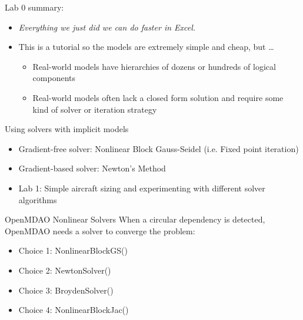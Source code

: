 \documentclass[aspectratio=169, usenames,dvipsnames, 14pt]{beamer}
\begin{document}
\begin{frame}{Lab 0 summary:}
    \begin{itemize}
        \item \textit{Everything we just did we can do faster in Excel.}
        \vspace{0.5cm}
        \item This is a tutorial so the models are extremely simple and cheap, but … 
        \vspace{0.25cm}
            \begin{itemize}
                \vspace{0.25cm}
                \item Real-world models have hierarchies of dozens or hundreds of logical components
                \vspace{0.25cm}
                \item Real-world models often lack a closed form solution and require some kind of solver or iteration strategy
            \end{itemize}
    \end{itemize}
\end{frame}


\begingroup
{}
\begin{frame}{Using solvers with implicit models}

    \begin{itemize}
        \item Gradient-free solver: Nonlinear Block Gauss-Seidel (i.e. Fixed point iteration)  
        \vspace{0.5cm}
        \item Gradient-based solver: Newton’s Method
        \vspace{0.5cm}
        \item Lab 1: Simple aircraft sizing and experimenting with different solver algorithms
    \end{itemize}
\end{frame}
\endgroup


\begin{frame}{OpenMDAO Nonlinear Solvers}
    When a circular dependency is detected, OpenMDAO needs a solver to converge the problem:
    
    \begin{itemize}
        \item Choice 1: NonlinearBlockGS()
        \item Choice 2: NewtonSolver()
        \item Choice 3: BroydenSolver()
        \item Choice 4: NonlinearBlockJac()
    \end{itemize}
\end{frame}
\end{document}
